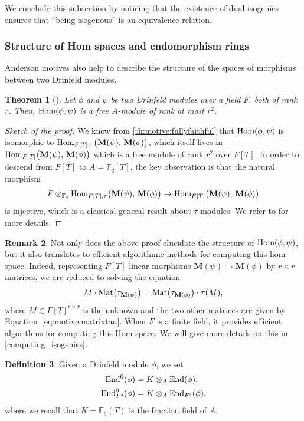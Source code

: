 \documentclass[11pt]{article}
\newtheorem{theorem}{Theorem}[section]
\theoremstyle{definition}
\newtheorem{definition}[theorem]{Definition}
\newtheorem{remark}[theorem]{Remark}
\newcommand\Fq{\mathbb{F}_q}
\newcommand{\Hom}{\text{\rm Hom}}
\newcommand\End{\text{\rm End}}
\newcommand{\MM}{\mathbf{M}}
\newcommand{\Fs}{F^{\text{\rm s}}}
\newcommand{\Mat}{\text{\rm Mat}}
\begin{document}
We conclude this subsection by noticing that the existence of dual isogenies ensures that ``being isogenous'' is an equivalence relation.


\subsubsection{Structure of Hom spaces and endomorphism rings}
\label{subsec:hom-spaces}

Anderson motives also help to describe the structure of the
spaces of morphisms between two Drinfeld modules.

\begin{theorem}[{\cite[Theorem~3.4.1]{Pap23}}]
\label{theorem:structure-homset}
  Let $\phi$ and $\psi$ be two Drinfeld modules over a field $F$, both
  of rank $r$. Then, $\Hom(\phi, \psi)$ is a free $A$-module of rank
  at most $r^2$.
\end{theorem}

\begin{proof}[Sketch of the proof]
We know from \cref{th:motive:fullyfaithful} that 
$\Hom(\phi, \psi)$ is isomorphic to
$\Hom_{F[T], \tau}\big(\MM(\psi),\,\MM(\phi)\big)$, which itself
lives in $\Hom_{F[T]}\big(\MM(\psi),\,\MM(\phi)\big)$ which is a
free module of rank $r^2$ over $F[T]$.
In order to descend from $F[T]$ to $A = \Fq[T]$, the key observation is that the natural morphism
$$F \otimes_{\Fq} \Hom_{F[T], \tau}\big(\MM(\psi),\,\MM(\phi)\big)
\to \Hom_{F[T]}\big(\MM(\psi),\,\MM(\phi)\big)$$
is injective, which is a classical general result about
$\tau$-modules.
We refer to \cite[Proposition~3.4.6]{Pap23} for more details.
\end{proof}

\begin{remark}
\label{rem:computeHom}
Not only does the above proof elucidate the structure of $\Hom(\phi, \psi)$, but it also translates to efficient algorithmic methods for computing this hom space.
Indeed, representing $F[T]$-linear morphisms $\MM(\psi) \to \MM(\phi)$ by $r \times r$ matrices, we are reduced to solving the equation
\begin{equation}\label{eq:computeHom}
M \cdot \Mat\big(\tau_{\MM(\psi)}\big) 
= \Mat\big(\tau_{\MM(\phi)}\big) \cdot \tau(M),
\end{equation}
where $M \in F[T]^{r \times r}$ is the unknown and the two other
matrices are given by Equation~\eqref{eq:motive:matrixtau}. When $F$ is a finite field, it provides efficient algorithms for computing this Hom space.
We will give more details on this in \cref{computing_isogenies}.
\end{remark}
\begin{definition}
\label{def:algebra-of-endomorphisms}
Given a Drinfeld module $\phi$, we set
\begin{align*}
  \End^0(\phi) &= K \otimes_A \End(\phi),\\
  \End_{\Fs}^0(\phi) &= K \otimes_A \End_{\Fs}(\phi),
\end{align*}   
where we recall that $K = \Fq(T)$ is the fraction field of $A$.
\end{definition}
\end{document}
